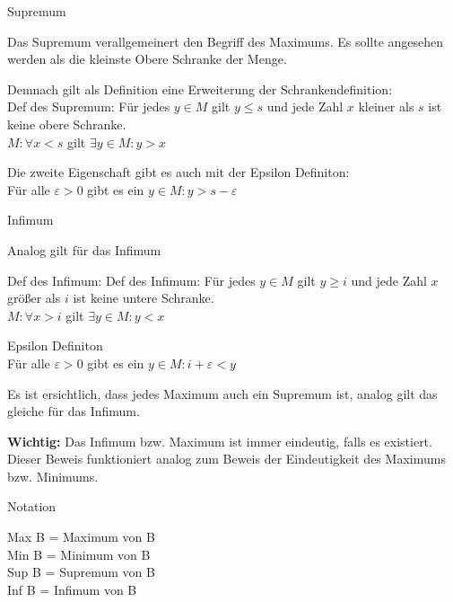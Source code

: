 \documentclass[headsepline,12pt,a4paper]{scrartcl}
\begin{document}
\begin{center}
\item[Supremum]
\end{center}
\item Das Supremum verallgemeinert den Begriff des Maximums. Es sollte angesehen werden als die kleinste Obere Schranke der Menge.
\item Demnach gilt als Definition eine Erweiterung der Schrankendefinition:\\

Def des Supremum:
Für jedes $ y \in M $ gilt $ y \leq s $
und jede Zahl $x$ kleiner als $s$ ist keine obere Schranke. \\
$ M: \forall x < s $ gilt $ \exists y \in M : y > x $ \\

\item Die zweite Eigenschaft gibt es auch mit der Epsilon Definiton: \\
Für alle $ \varepsilon > 0 $ gibt es ein $ y \in M : y > s - \varepsilon $

\newpage
 

\begin{center}
\item[Infimum]
\end{center}
\item Analog gilt für das Infimum
\item Def des Infimum: Def des Infimum:
Für jedes $ y \in M $ gilt $ y \geq i $
und jede Zahl $x$ größer als $i$ ist keine untere Schranke. \\
$ M: \forall x > i $ gilt $ \exists y \in M : y < x $ \\
\item Epsilon Definiton \\
Für alle $ \varepsilon > 0 $ gibt es ein $ y \in M : i+ \varepsilon < y $ \\

\item Es ist ersichtlich, dass jedes Maximum auch ein Supremum ist, analog gilt das gleiche für das Infimum.
\item \textbf{Wichtig:} Das Infimum bzw. Maximum ist immer eindeutig, falls es existiert. Dieser Beweis funktioniert analog zum Beweis der Eindeutigkeit des Maximums bzw. Minimums.

\begin{center}
\item[Notation]
\end{center}
\item Max B = Maximum von B \\
Min B = Minimum von B \\
Sup B = Supremum von B \\
Inf B = Infimum von B \\
\end{document}
